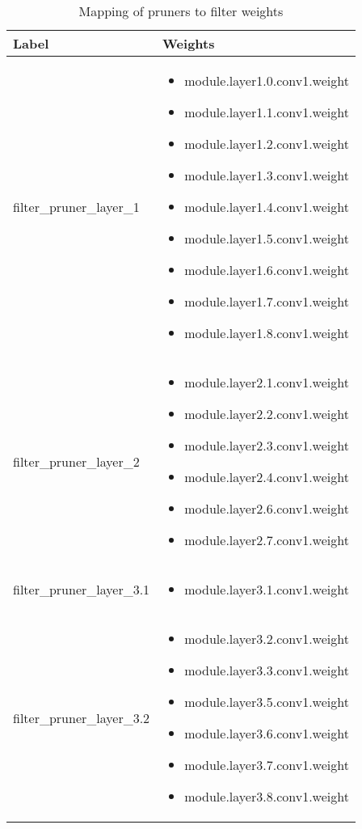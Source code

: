 \documentclass[../Dissertation.tex]{subfiles}
\begin{document}
\singlespacing
\begin{table}[H]
    \centering
    \setlength{\extrarowheight}{0.5pt}
    \setlength{\tabcolsep}{3pt}
    \begin{tabularx}{0.6\textwidth}{|p{40mm}|*{1}{>{\compress\RaggedRight\arraybackslash} X |}}
    \hline
    Label & Weights  \\
    \hline
    filter\_pruner\_layer\_1
    & \begin{itemize}
        \item module.layer1.0.conv1.weight
        \item module.layer1.1.conv1.weight
        \item module.layer1.2.conv1.weight
        \item module.layer1.3.conv1.weight
        \item module.layer1.4.conv1.weight
        \item module.layer1.5.conv1.weight
        \item module.layer1.6.conv1.weight
        \item module.layer1.7.conv1.weight
        \item module.layer1.8.conv1.weight
    \end{itemize} \\ 
    \hline
    filter\_pruner\_layer\_2 
    & \begin{itemize}
        \item module.layer2.1.conv1.weight
        \item module.layer2.2.conv1.weight
        \item module.layer2.3.conv1.weight
        \item module.layer2.4.conv1.weight
        \item module.layer2.6.conv1.weight
        \item module.layer2.7.conv1.weight
    \end{itemize} \\ 
    \hline
    filter\_pruner\_layer\_3.1
    & \begin{itemize}
        \item module.layer3.1.conv1.weight
    \end{itemize} \\
    \hline
    filter\_pruner\_layer\_3.2
    & \begin{itemize}
        \item module.layer3.2.conv1.weight
        \item module.layer3.3.conv1.weight
        \item module.layer3.5.conv1.weight
        \item module.layer3.6.conv1.weight
        \item module.layer3.7.conv1.weight
        \item module.layer3.8.conv1.weight
    \end{itemize}\\ \hline
    \end{tabularx}
    \caption{Mapping of pruners to filter weights}
    \label{tab:scheduleWeights}
\end{table}
\end{document}

